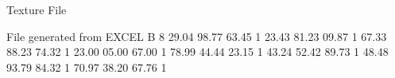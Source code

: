 Texture File

File generated from EXCEL
B 8
29.04 98.77 63.45 1
23.43 81.23 09.87 1
67.33 88.23 74.32 1
23.00 05.00 67.00 1
78.99 44.44 23.15 1
43.24 52.42 89.73 1
48.48 93.79 84.32 1
70.97 38.20 67.76 1
